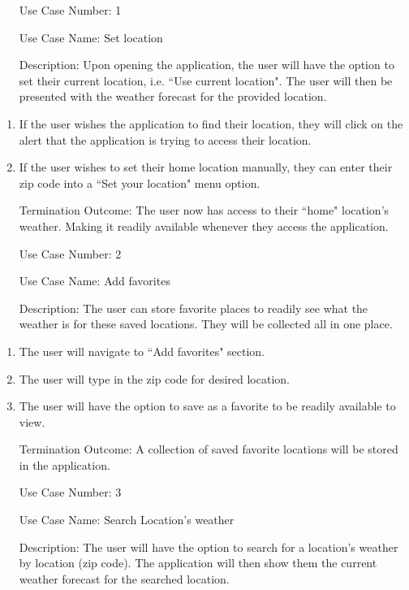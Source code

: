 \documentclass[10pt,conference,onecolumn,compsoc]{IEEEtran}
\begin{document}
\begin{itemize}
\item[Use Case Number:] 1
\item[Use Case Name:] Set location
\item[Description:] Upon opening the application, the user will have the option to set their current location, i.e. ``Use current location". The user will then be presented with the weather forecast for the provided location.
\end{itemize}

\begin{enumerate}
\item If the user wishes the application to find their location, they will click on the alert that the application is trying to access their location.
\item If the user wishes to set their home location manually, they can enter their zip code into a ``Set your location" menu option.
\item[Termination Outcome:] The user now has access to their ``home" location's weather. Making it readily available whenever they access the application.
\end{enumerate}

\begin{itemize}
\item[Use Case Number:] 2
\item[Use Case Name:] Add favorites
\item[Description:] The user can store favorite places to readily see what the weather is for these saved locations. They will be collected all in one place.
\end{itemize}

\begin{enumerate}
\item The user will navigate to ``Add favorites" section.
\item The user will type in the zip code for desired location.
\item The user will have the option to save as a favorite to be readily available to view.
\item[Termination Outcome:] A collection of saved favorite locations will be stored in the application.
\end{enumerate}

\begin{itemize}
\item[Use Case Number:] 3
\item[Use Case Name:] Search Location's weather
\item[Description:] The user will have the option to search for a location's weather by location (zip code). The application will then show them the current weather forecast for the searched location. 
\end{itemize}
\end{document}
